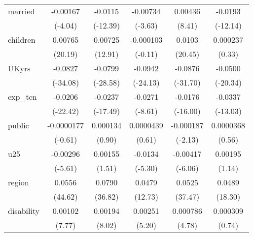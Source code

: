 {\begin{longtable}{l*{5}{c}}
married     &    -0.00167\sym{***}&     -0.0115\sym{***}&    -0.00734\sym{***}&     0.00436\sym{***}&     -0.0193\sym{***}\\
            &     (-4.04)         &    (-12.39)         &     (-3.63)         &      (8.41)         &    (-12.14)         \\
children    &     0.00765\sym{***}&     0.00725\sym{***}&   -0.000103         &      0.0103\sym{***}&    0.000237         \\
            &     (20.19)         &     (12.91)         &     (-0.11)         &     (20.45)         &      (0.33)         \\
UKyrs       &     -0.0827\sym{***}&     -0.0799\sym{***}&     -0.0942\sym{***}&     -0.0876\sym{***}&     -0.0500\sym{***}\\
            &    (-34.08)         &    (-28.58)         &    (-24.13)         &    (-31.70)         &    (-20.34)         \\
exp\_ten     &     -0.0206\sym{***}&     -0.0237\sym{***}&     -0.0271\sym{***}&     -0.0176\sym{***}&     -0.0337\sym{***}\\
            &    (-22.42)         &    (-17.49)         &     (-8.61)         &    (-16.00)         &    (-13.03)         \\
public      &  -0.0000177         &    0.000134         &   0.0000439         &   -0.000187\sym{*}  &   0.0000368         \\
            &     (-0.61)         &      (0.90)         &      (0.61)         &     (-2.13)         &      (0.56)         \\
u25         &    -0.00296\sym{***}&     0.00155         &     -0.0134\sym{***}&    -0.00417\sym{***}&     0.00195         \\
            &     (-5.61)         &      (1.51)         &     (-5.30)         &     (-6.06)         &      (1.14)         \\
region      &      0.0556\sym{***}&      0.0790\sym{***}&      0.0479\sym{***}&      0.0525\sym{***}&      0.0489\sym{***}\\
            &     (44.62)         &     (36.82)         &     (12.73)         &     (37.47)         &     (18.30)         \\
disability  &     0.00102\sym{***}&     0.00194\sym{***}&     0.00251\sym{***}&    0.000786\sym{***}&    0.000309         \\
            &      (7.77)         &      (8.02)         &      (5.20)         &      (4.78)         &      (0.74)         \\

\end{longtable}}
